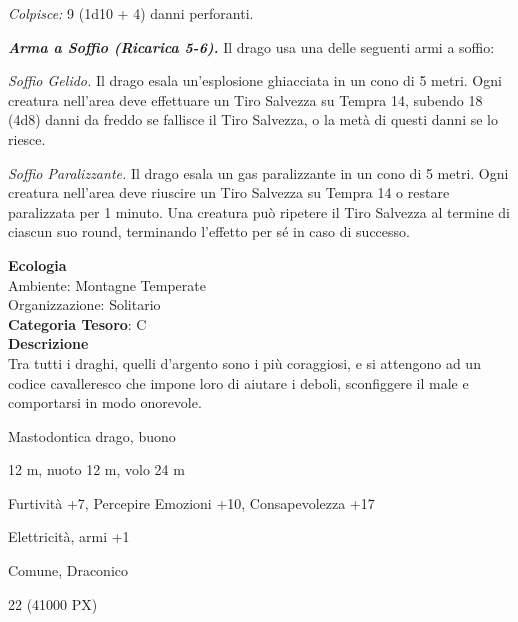 \begin{multicols}{2}
{\emph{Colpisce:} 9 (1d10 + 4) danni perforanti.

\emph{\textbf{Arma a Soffio (Ricarica 5-6).}} Il drago usa una delle seguenti armi a soffio:

\emph{Soffio Gelido.} Il drago esala un'esplosione ghiacciata in un cono di 5 metri. Ogni creatura nell'area deve effettuare un Tiro Salvezza su Tempra 14, subendo 18 (4d8) danni da freddo se fallisce il Tiro Salvezza, o la metà di questi danni se lo riesce.

\emph{Soffio Paralizzante.} Il drago esala un gas paralizzante in un cono di 5 metri. Ogni creatura nell'area deve riuscire un Tiro Salvezza su Tempra 14 o restare paralizzata per 1 minuto. Una creatura può ripetere il Tiro Salvezza al termine di ciascun suo round, terminando l'effetto per sé in caso di successo.

\textbf{Ecologia}\\
Ambiente: Montagne Temperate\\
Organizzazione: Solitario\\
\textbf{Categoria Tesoro}: C\\
\textbf{Descrizione}\\
Tra tutti i draghi, quelli d'argento sono i più coraggiosi, e si attengono ad un codice cavalleresco che impone loro di aiutare i deboli, sconfiggere il male e comportarsi in modo onorevole.



\begin{description}[noitemsep, topsep=0pt, parsep=0pt, partopsep=0pt, itemsep=1pt, leftmargin=2.35cm,  labelwidth=2.2cm, itemindent=0cm, listparindent=0pt] %
\setlength{\baselineskip}{10pt}
\item[\textbf{Taglia/Tipo}] Mastodontica drago, buono
\item[\textbf{Caratt.}] 
\item[\textbf{Punti Ferita}] 
\item[\textbf{Movimento}] 12 m, nuoto 12 m, volo 24 m
\item[\textbf{Tiri Salvez.}] 
\item[\textbf{Comp.}] Furtività +7, Percepire Emozioni +10, Consapevolezza +17
\item[\textbf{Imm. Danni}] Elettricità, armi +1
\item[\textbf{Sensi}] 
\item[\textbf{Linguaggi}] Comune, Draconico
\item[\textbf{Sfida}] 22 (41000 PX)
\end{description}
\smallskip

}
\end{multicols}
